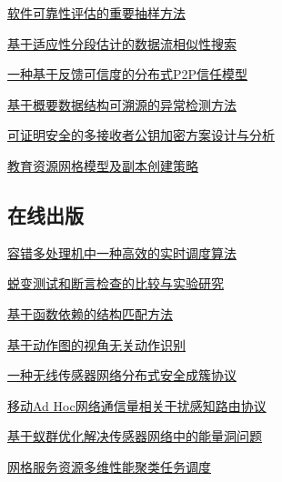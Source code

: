 \documentclass[a4paper]{article}
\begin{document}
\href{http://www.jos.org.cn/ch/reader/download_pdf.aspx?file_no=3553&year_id=2009&quarter_id=10&falg=1}{软件可靠性评估的重要抽样方法}

\href{http://www.jos.org.cn/ch/reader/download_pdf.aspx?file_no=3548&year_id=2009&quarter_id=10&falg=1}{基于适应性分段估计的数据流相似性搜索}

\href{http://www.jos.org.cn/ch/reader/download_pdf.aspx?file_no=3554&year_id=2009&quarter_id=10&falg=1}{一种基于反馈可信度的分布式P2P信任模型}

\href{http://www.jos.org.cn/ch/reader/download_pdf.aspx?file_no=3685&year_id=2009&quarter_id=10&falg=1}{基于概要数据结构可溯源的异常检测方法}

\href{http://www.jos.org.cn/ch/reader/download_pdf.aspx?file_no=3552&year_id=2009&quarter_id=10&falg=1}{可证明安全的多接收者公钥加密方案设计与分析}

\href{http://www.jos.org.cn/ch/reader/download_pdf.aspx?file_no=3377&year_id=2009&quarter_id=10&falg=1}{教育资源网格模型及副本创建策略}

\subsection{在线出版}
\href{http://www.jos.org.cn/ch/reader/download_pdf.aspx?file_no=577&year_id=2009&quarter_id=10&falg=1}{容错多处理机中一种高效的实时调度算法}

\href{http://www.jos.org.cn/ch/reader/download_pdf.aspx?file_no=578&year_id=2009&quarter_id=10&falg=1}{蜕变测试和断言检查的比较与实验研究}

\href{http://www.jos.org.cn/ch/reader/download_pdf.aspx?file_no=3487&year_id=2009&quarter_id=10&falg=1}{基于函数依赖的结构匹配方法}

\href{http://www.jos.org.cn/ch/reader/download_pdf.aspx?file_no=3499&year_id=2009&quarter_id=10&falg=1}{基于动作图的视角无关动作识别}

\href{http://www.jos.org.cn/ch/reader/download_pdf.aspx?file_no=3488&year_id=2009&quarter_id=10&falg=1}{一种无线传感器网络分布式安全成簇协议}

\href{http://www.jos.org.cn/ch/reader/download_pdf.aspx?file_no=3502&year_id=2009&quarter_id=10&falg=1}{移动Ad Hoc网络通信量相关干扰感知路由协议}

\href{http://www.jos.org.cn/ch/reader/download_pdf.aspx?file_no=3462&year_id=2009&quarter_id=10&falg=1}{基于蚁群优化解决传感器网络中的能量洞问题}

\href{http://www.jos.org.cn/ch/reader/download_pdf.aspx?file_no=3506&year_id=2009&quarter_id=10&falg=1}{网格服务资源多维性能聚类任务调度}
\end{document}
